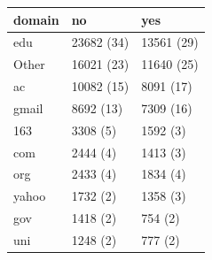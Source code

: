 \begin{table}[ht]
\centering
\begin{tabular}{lll}
 domain & no & yes \\ 
  \hline
edu & 23682 (34) & 13561 (29) \\ 
  Other & 16021 (23) & 11640 (25) \\ 
  ac & 10082 (15) & 8091 (17) \\ 
  gmail & 8692 (13) & 7309 (16) \\ 
  163 & 3308 (5) & 1592 (3) \\ 
  com & 2444 (4) & 1413 (3) \\ 
  org & 2433 (4) & 1834 (4) \\ 
  yahoo & 1732 (2) & 1358 (3) \\ 
  gov & 1418 (2) & 754 (2) \\ 
  uni & 1248 (2) & 777 (2) \\ 
  \end{tabular}
\end{table}
